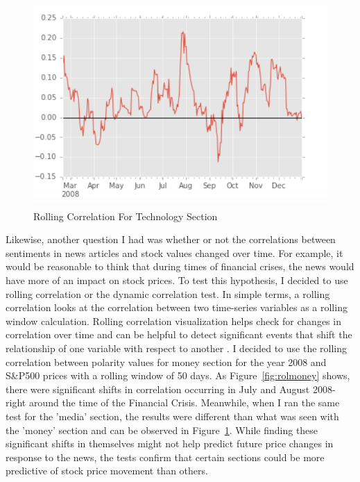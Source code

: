 \documentclass{acm_proc_article-sp}
\begin{document}
\begin{figure}[h]
\includegraphics[width=\linewidth]{figures/rolling_corr_tech.png}
\caption{Rolling Correlation For Technology Section}
\label{fig:roltech}
\end{figure}



Likewise, another question I had was whether or not the correlations between sentiments in news articles and stock values changed over time. For example, it would be reasonable to think that during times of financial crises, the news would have more of an impact on stock prices. To test this hypothesis, I decided to use rolling correlation or the dynamic correlation test. In simple terms, a rolling correlation looks at the correlation between two time-series variables as a rolling window calculation. Rolling correlation visualization helps check for changes in correlation over time and can be helpful to detect significant events that shift the relationship of one variable with respect to another \cite{business-science.io_tidy_2017}. I decided to use the rolling correlation between polarity values for money section for the year 2008 and S&P500 prices with a rolling window of 50 days. As Figure~\ref{fig:rolmoney} shows, there were significant shifts in correlation occurring in July and August 2008- right around the time of the Financial Crisis. Meanwhile, when I ran the same test for the 'media' section, the results were different than what was seen with the 'money' section and can be observed in Figure~\ref{fig:roltech}. While finding these significant shifts in themselves might not help predict future price changes in response to the news, the tests confirm that certain sections could be more predictive of stock price movement than others.
\end{document}
